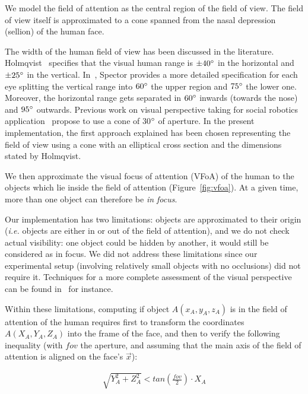 \documentclass{sig-alternate}
\newcommand{\ie}{\textit{i.e.}\xspace}
\begin{document}
We model the field of attention as the central region of the field of view.
The field of view itself is approximated to a cone spanned from the nasal
depression (sellion) of the human face.

The width of the human field of view has been discussed in the literature.
Holmqvist~\cite{holmqvist2011eye} specifies that the visual human
range is $ \pm  40\degree $ in the
horizontal and $ \pm 25\degree $ in the vertical.
In~\cite{walker1980clinical}, Spector provides a more detailed specification
for each eye splitting the vertical range into $ 60\degree $ the upper region
and $ 75\degree $ the lower one. Moreover, the horizontal range gets separated
in $ 60\degree $ inwards (towards the nose) and $ 95\degree $ outwards.
Previous work on visual perspective taking for social robotics
application~\cite{sisbot2011situation} propose to use a cone of 30$\degree$ of
aperture. In the present implementation, the first approach explained has been
chosen representing the field of view using a cone with an elliptical cross section 
and the dimensions stated by Holmqvist.

We then approximate the visual focus of attention (VFoA) of the human to the
objects which lie inside the field of attention (Figure~\ref{fig:vfoa}). At a
given time, more than one object can therefore be \emph{in focus}.

Our implementation has two limitations: objects are approximated to their origin
(\ie objects are either in or out of the field of attention), and we do not
check actual visibility: one object could be hidden by another, it would still
be considered as in focus. We did not address these limitations since our
experimental setup (involving relatively small objects with no occlusions) did
not require it. Techniques for a more complete assessment of the visual
perspective can be found in~\cite{sisbot2011situation} for instance.

Within these limitations, computing if object $A(x_A,y_A,z_A)$ is in the field
of attention of the human requires first to transform the coordinates
$A(X_A,Y_A,Z_A)$ into the frame of the face, and then to verify the following
inequality (with $fov$ the aperture, and assuming that the main axis of the
field of attention is aligned on the face's $\vec{x}$):

\begin{align}
    \sqrt{Y_A^2 + Z_A^2} < tan\left(\frac{fov}{2}\right) \cdot X_A
\label{eq:fov}
\end{align}
\end{document}
